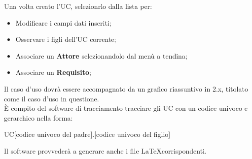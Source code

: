       Una volta creato l'UC, selezionrlo dalla lista per:
      \begin{itemize}
        \item Modificare i campi dati inseriti;
        \item Osservare i figli dell'UC corrente;
        \item Associare un \textbf{Attore} selezionandolo dal menù a tendina;
        \item Associare un \textbf{Requisito};
      \end{itemize}
      Il caso d'uso dovrà essere accompagnato da un grafico riassuntivo in 2.x, titolato come il caso d'uso in questione.\\
      È compito del software di tracciamento tracciare gli UC con un codice univoco e gerarchico nella forma:
      \begin{center}
        UC[codice univoco del padre].[codice univoco del figlio]
      \end{center}
      Il software provvederà a generare anche i file \LaTeX corrispondenti.
